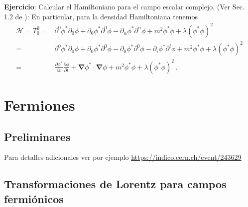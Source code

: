 \textbf{Ejercicio}: Calcular el Hamiltoniano para el campo escalar complejo. (Ver Sec. 1.2 de \cite{Greiner:1990tz}):
En particular, para la densidad Hamiltoniana tenemos
\begin{align}
 \mathcal{H}=  T^0_0 =&\partial^0\phi^* \partial_0 \phi + \partial_0 \phi^* \partial^0\phi-\partial_{\alpha}\phi^{*} \partial^{\alpha}\phi+m^2\phi^{*}\phi+\lambda \left(\phi^{*}\phi \right)^2 \nonumber\\
  =&\partial^0\phi^* \partial_0 \phi + \partial_0 \phi^* \partial^0\phi-\partial_{0}\phi^{*} \partial^{0}\phi-\partial_{i}\phi^{*} \partial^i\phi+m^2\phi^{*}\phi+\lambda \left(\phi^{*}\phi \right)^2 \nonumber\\
  =&\frac{\partial\phi^*}{\partial t} \frac{\partial\phi}{\partial t}  +\boldsymbol{\nabla}\phi^{*}\cdot\boldsymbol{\nabla}\phi+m^2\phi^{*}\phi+\lambda \left(\phi^{*}\phi \right)^2 \,.
\end{align}






\chapter{Fermiones}
\label{cha:fermiones} %

\section{Preliminares}

Para detalles adicionales ver por ejemplo \url{https://indico.cern.ch/event/243629}


\section{Transformaciones de Lorentz para campos fermiónicos}
\label{sec:transf-de-lorentz-1}

